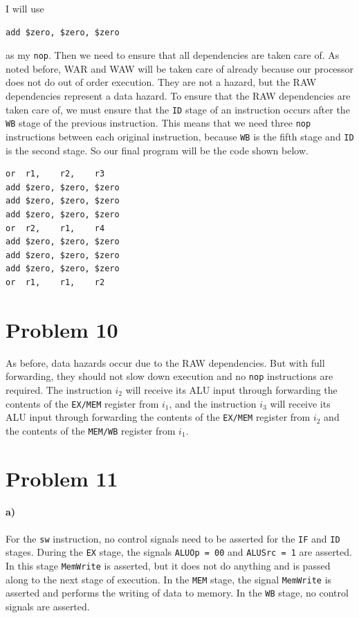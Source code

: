 \documentclass[12pt]{article}
\begin{document}
I will use
\begin{verbatim}
add $zero, $zero, $zero
\end{verbatim}
as my \texttt{nop}. Then we need to ensure that all dependencies are taken care of. As noted before, WAR and WAW will be taken care of already because our processor
does not do out of order execution. They are not a hazard, but the RAW dependencies represent a data hazard. To ensure that the RAW dependencies are taken care of,
we must ensure that the \texttt{ID} stage of an instruction occurs after the \texttt{WB} stage of the previous instruction. This means that we need three
\texttt{nop} instructions between each original instruction, because \texttt{WB} is the fifth stage and \texttt{ID} is the second stage. So our final program
will be the code shown below.
\begin{verbatim}
or  r1,    r2,    r3
add $zero, $zero, $zero
add $zero, $zero, $zero
add $zero, $zero, $zero
or  r2,    r1,    r4
add $zero, $zero, $zero
add $zero, $zero, $zero
add $zero, $zero, $zero
or  r1,    r1,    r2
\end{verbatim}

\section*{Problem 10}

As before, data hazards occur due to the RAW dependencies. But with full forwarding, they should not slow down execution and no \texttt{nop} instructions are
required. The instruction \(i_2\) will receive its ALU input through forwarding the contents of the \texttt{EX/MEM} register from \(i_1\), and the instruction
\(i_3\) will receive its ALU input through forwarding the contents of the \texttt{EX/MEM} register from \(i_2\) and the contents of the \texttt{MEM/WB} register from
\(i_1\).

\section*{Problem 11}

\paragraph{a)}

For the \texttt{sw} instruction, no control signals need to be asserted for the \texttt{IF} and \texttt{ID} stages. During the \texttt{EX} stage, the signals
\texttt{ALUOp = 00} and \texttt{ALUSrc = 1} are asserted. In this stage \texttt{MemWrite} is asserted, but it does not do anything and is passed along to the
next stage of execution. In the \texttt{MEM} stage, the signal \texttt{MemWrite} is asserted and performs the writing of data to memory. In the \texttt{WB} stage,
no control signals are asserted.
\end{document}
